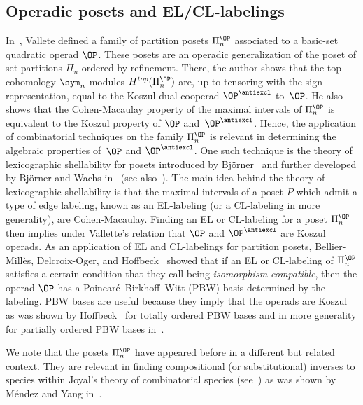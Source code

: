  \subsection{Operadic posets and EL/CL-labelings}
In~\cite{Vallette2007},  Vallete  defined a family of partition posets $\Pi_n^{\OP}$ associated to a basic-set quadratic operad $\OP$. 
 These posets are an operadic generalization of the poset of set partitions $\Pi_n$ ordered by refinement. There, the author shows  that the top cohomology $\sym_n$-modules $H^{top}(\Pi_n^{\OP})$ are, up to tensoring with the sign representation, equal to the Koszul dual cooperad $\OP^{\antiexcl}$ to~$\OP$. He also shows that the Cohen-Macaulay property of the maximal intervals of $\Pi_n^{\OP}$ is equivalent to the Koszul property of $\OP$ and~$\OP^{\antiexcl}$. Hence, the application of combinatorial techniques on the family $\Pi_n^{\OP}$ is relevant in determining the algebraic properties of~$\OP$ and $\OP^{\antiexcl}$. One such technique is the theory of lexicographic shellability for posets introduced by Bj\"orner~\cite{Bjorner1980} and further developed by Bj\"orner and Wachs in~\cite{BjornerWachs1982, BjornerWachs1983} (see also~\cite{BjornerWachs1996,BjornerWachs1997}). The main idea behind the theory of lexicographic shellability is that the maximal intervals of a poset $P$ which admit a type of edge labeling, known as an EL-labeling (or a CL-labeling in more generality), are Cohen-Macaulay. Finding an EL or CL-labeling for a poset  $\Pi_n^{\OP}$ then implies under Vallette's relation that  $\OP$ and $\OP^{\antiexcl}$ are Koszul operads.  As an application of EL and CL-labelings for partition posets,   Bellier-Mill{\`e}s, Delcroix-Oger, and Hoffbeck~\cite{BelliermillesDelcroixogerHoffbeck2021} showed that if an EL or CL-labeling of $\Pi_n^{\OP}$ satisfies a certain condition that they call being \emph{isomorphism-compatible}, then the operad $\OP$ has a Poincar\'{e}--Birkhoff--Witt (PBW) basis determined by the labeling.  PBW bases are useful because they imply that the operads are Koszul as was shown by Hoffbeck~\cite{Hoffbeck2010} for totally ordered PBW bases and  in more generality for partially ordered PBW bases in~\cite{BelliermillesDelcroixogerHoffbeck2021}.
 
  We note that the posets $\Pi_n^{\OP}$ 
 have appeared before in a different but related context. They are relevant in finding compositional (or substitutional) inverses to species within Joyal's theory of combinatorial species (see~\cite{Joyal1981,BergeronLabelleLeroux1998}) as was shown  by M\'endez and Yang in~\cite{MendezYang1991}.  
 


